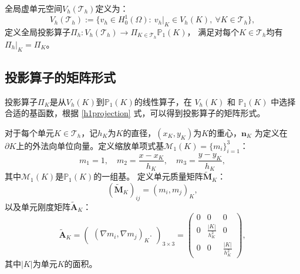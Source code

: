 全局虚单元空间$V_h(\mathcal{T}_h)$定义为：
$$
V_h(\mathcal{T}_h) := \{ v_h \in H^1_0(\Omega) : ~ v_h|_K \in V_h(K), ~ \forall
K \in \mathcal{T}_h \},
$$
定义全局投影算子$\Pi_h : V_h(\mathcal{T}_h) \to 
\Pi_{K\in\mathcal{T}_h} \mathbb{P}_1(K)$，
满足对每个$K \in \mathcal{T}_h$均有$\Pi_h|_K = \Pi_K$。

\subsection{投影算子的矩阵形式}
\label{projectionmatrix}
投影算子$\Pi_K$是从$V_h(K)$到$\mathbb{P}_1(K)$的线性算子，在 
$V_h(K)$ 和 $\mathbb{P}_1(K)$ 中选择合适的基函数，根据
\eqref{h1projection} 式，可以得到投影算子的矩阵形式。

对于每个单元$K \in \mathcal{T}_h$，记$h_K$为$K$的直径，$(x_K,
y_K)$为$K$的重心，$\boldsymbol{n}_K$ 为定义在 
$\partial K$上的外法向单位向量。定义缩放单项式基$\mathcal{M}_1(K)
= \{m_{i}\}_{i=1}^3$：
$$
m_1 = 1, \quad m_2 = \frac{x - x_K}{h_K}, \quad m_3 = \frac{y - y_K}{h_K},
$$
其中$\mathcal{M}_1(K)$是$\mathbb{P}_1(K)$的一组基。
定义单元质量矩阵$\tilde{\boldsymbol{M}}_K$：
$$
(\tilde{\boldsymbol{M}}_K)_{ij} = (m_i, m_j)_K,
$$
以及单元刚度矩阵$\tilde{\boldsymbol{A}}_K$：
$$
\tilde{\boldsymbol{A}}_K =
\begin{pmatrix}
    (\nabla m_i, \nabla m_j)_K.
\end{pmatrix}_{3\times 3}
 =
\begin{pmatrix}
    0 & 0 & 0\\
    0 & \frac{|K|}{h_K^2} & 0\\
    0 & 0 & \frac{|K|}{h_K^2}
\end{pmatrix},
$$
其中$|K|$为单元$K$的面积。


